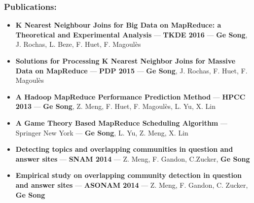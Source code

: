 \begin{comment}
\begin{frame}
\frametitle{Publications}
\vspace{-0.2in}
\begin{center}
\includegraphics<1>[width=0.8\textwidth]{figs/paper.png}
\end{center}
\end{frame}
\end{comment}


\begin{frame}
\frametitle{Publications: }
\vspace{-0.1in}
\begin{itemize}

\item \small{\textbf{K Nearest Neighbour Joins for Big Data on MapReduce: a Theoretical and Experimental Analysis} --- \textbf{TKDE 2016}  --- \textbf{Ge Song}, J. Rochas, L. Beze, F. Huet, F. Magoulès}

\item \textbf{Solutions for Processing K Nearest Neighbor Joins for Massive Data on MapReduce} --- \textbf{PDP 2015}  --- \textbf{Ge Song}, J. Rochas, F. Huet, F. Magoulès

\item \textbf{A Hadoop MapReduce Performance Prediction Method} --- \textbf{HPCC 2013}  --- \textbf{Ge Song}, Z. Meng, F. Huet, F. Magoulès, L. Yu, X. Lin

\item \textbf{A Game Theory Based MapReduce Scheduling Algorithm} --- Springer New York --- \textbf{Ge Song}, L. Yu, Z. Meng, X. Lin

\item \textbf{Detecting topics and overlapping communities in question and answer sites} --- \textbf{SNAM 2014}  --- 	Z. Meng, F. Gandon, C.Zucker, \textbf{Ge Song}

\item  \textbf{Empirical study on overlapping community detection in question and answer sites} --- \textbf{ASONAM 2014} --- 	Z. Meng, F. Gandon, C. Zucker, \textbf{Ge Song}

\end{itemize}
\end{frame}



